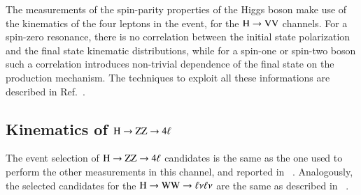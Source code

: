 The measurements of the spin-parity properties of the Higgs boson make
use of the kinematics of the four leptons in the event, for the
$\mathrm{H}\to\mathrm{V}\mathrm{V}$ channels.  For a spin-zero resonance, there is no
correlation between the initial state polarization and the final state
kinematic distributions, while for a spin-one or spin-two boson such a
correlation introduces non-trivial dependence of the final state on
the production mechanism.  The techniques to exploit all these
informations are described in Ref.~\cite{CMS:2014gga}.


\subsection{Kinematics of $\mathrm{H}\to\mathrm{Z}\mathrm{Z}\to4\ell$}
\label{sec:hzzkinematics}
The event selection of $\mathrm{H}\to\mathrm{Z}\mathrm{Z}\to4\ell$ candidates is the same as the one
used to perform the other measurements in this channel, and reported
in ~\cite{Chatrchyan:2013mxa}. Analogously, the selected candidates
for the $\mathrm{H}\to\mathrm{W}\mathrm{W}\to\ell\nu\ell\nu$ are the same as described in
~\cite{Chatrchyan:2013iaa}. 


